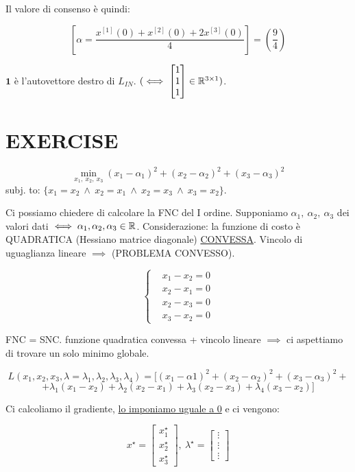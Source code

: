 \begin{itemize}
Il valore di consenso è quindi:

\[
	[\alpha = \frac{x^{[1]}(0) + x^{[2]}(0) + 2x^{[3]}(0)}{4}] = (\frac{9}{4})
\]

$\mathbf{1}$ è l'autovettore destro di $L_{IN}$. $(\iff \begin{bmatrix}1\\1\\1\end{bmatrix} \in\mathbb{R}^{3\times 1})$.

\end{itemize}

\section{EXERCISE}

\[
	\min_{x_1,\ x_2,\ x_3}{(x_1-\alpha_1)^2 + (x_2-\alpha_2)^2 + (x_3-\alpha_3)^2}
\]
subj. to: $\{x_1=x_2\ \land\ x_2=x_1\ \land\ x_2=x_3\ \land\ x_3=x_2\}$.

Ci possiamo chiedere di calcolare la FNC del I ordine. Supponiamo $\alpha_1,\ \alpha_2,\ \alpha_3$ dei valori dati $\iff \alpha_1,\alpha_2,\alpha_3\in\mathbb{R}$. Considerazione: la funzione di costo è QUADRATICA (Hessiano matrice diagonale) \underline{CONVESSA}. Vincolo di uguaglianza lineare $\implies$ (PROBLEMA CONVESSO).

\[
	\left\{
	\begin{aligned}
	&x_1-x_2=0\\
	&x_2-x_1=0\\
	&x_2-x_3=0\\
	&x_3-x_2=0
	\end{aligned}
	\right.
\]

FNC = SNC. funzione quadratica convessa + vincolo lineare $\implies$ ci aspettiamo di trovare un solo minimo globale.

\[
	L(x_1,x_2,x_3,\lambda=\lambda_1,\lambda_2,\lambda_3,\lambda_4) = [(x_1-\alpha1)^2 + (x_2-\alpha_2)^2 + (x_3-\alpha_3)^2 +
\]
\[
	+ \lambda_1(x_1-x_2) + \lambda_2(x_2-x_1) + \lambda_3(x_2-x_3) + \lambda_4(x_3-x_2)]
\]

Ci calcoliamo il gradiente, \underline{lo imponiamo uguale a 0} e ci vengono:

\[
	x^\star = \begin{bmatrix}x_1^\star\\x_2^\star\\x_3^\star\end{bmatrix},\ \lambda^\star = \begin{bmatrix}\vdots\\ \vdots\\ \vdots\end{bmatrix}
\]

